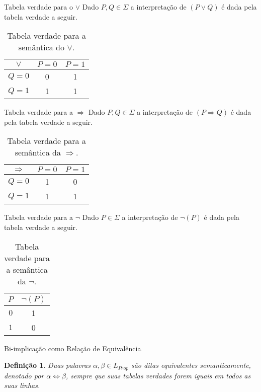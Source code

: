 \documentclass[aspectratio=169]{beamer}
\newtheorem{defi}{Definição}
\begin{document}
	\begin{frame}{Tabela verdade para o $\lor$}
		Dado $P, Q \in \Sigma$ a interpretação de $(P \lor Q)$ é dada pela tabela verdade a seguir.
		\begin{table}[h]
			\centering
			\begin{tabular}{c|c|c}
				\hline
				$\lor$ & $P = 0$ & $P = 1$ \\
				\hline
				$Q = 0$ & 0 &  1\\ 
				$Q = 1$ & 1 &  1\\
				\hline
			\end{tabular}
			\caption{Tabela verdade para a semântica do $\lor$.}
			\label{tab:Or}
		\end{table}
	\end{frame}

	\begin{frame}{Tabela verdade para a $\Rightarrow$}
		Dado $P, Q \in \Sigma$ a interpretação de $(P \Rightarrow Q)$ é dada pela tabela verdade a seguir.
		\begin{table}[h]
			\centering
			\begin{tabular}{c|c|c}
				\hline
				$\Rightarrow$ & $P = 0$ & $P = 1$ \\
				\hline
				$Q = 0$ & 1 &  0\\ 
				$Q = 1$ & 1 &  1\\
				\hline
			\end{tabular}
			\caption{Tabela verdade para a semântica da $\Rightarrow$.}
			\label{tab:Implicacao}
		\end{table}
	\end{frame}

	\begin{frame}{Tabela verdade para a $\neg$}
		Dado $P \in \Sigma$ a interpretação de $\neg (P)$ é dada pela tabela verdade a seguir.
		\begin{table}[h]
			\centering
			\begin{tabular}{c|c}
				\hline
				$P$ & $\neg (P)$\\
				\hline
				$0$ & 1\\ 
				$1$ &  0\\
				\hline
			\end{tabular}
			\caption{Tabela verdade para a semântica da $\neg$.}
			\label{tab:negacao}
		\end{table}
	\end{frame}

	\begin{frame}{Bi-implicação como Relação de Equivalência}
		\begin{defi}
			Duas palavras $\alpha, \beta \in L_{Prop}$ são ditas equivalentes semanticamente, denotado por $\alpha \Leftrightarrow \beta$, sempre que suas tabelas verdades forem iguais em todos as suas linhas.
		\end{defi}
	\end{frame}
\end{document}
